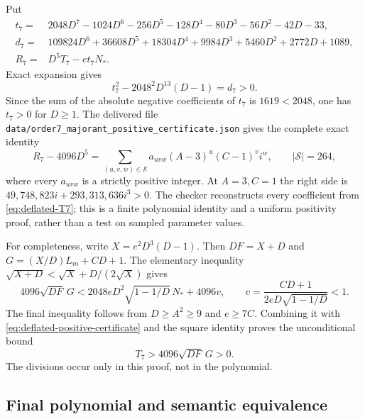 Put
\begin{align*}
 t_7={}&2048D^7-1024D^6-256D^5-128D^4
           -80D^3-56D^2-42D-33,\\
 d_7={}&109824D^6+36608D^5+18304D^4+9984D^3
           +5460D^2+2772D+1089,\\
 R_7={}&D^5T_7-et_7N_*.
\end{align*}
Exact expansion gives
\[
 t_7^2-2048^2D^{13}(D-1)=d_7>0.
\]
Since the sum of the absolute negative coefficients of \(t_7\) is
\(1619<2048\), one has \(t_7>0\) for \(D\geq1\).  The delivered
file \texttt{data/order7\_majorant\_positive\_certificate.json} gives
the complete exact identity
\begin{equation}
 R_7-4096D^5
   =\sum_{(u,v,w)\in\mathcal S} a_{uvw}(A-3)^u(C-1)^v i^w,
 \qquad |\mathcal S|=264,
 \label{eq:deflated-positive-certificate}
\end{equation}
where every \(a_{uvw}\) is a strictly positive integer.  At \(A=3,C=1\)
the right side is
\(49{,}748{,}823i+293{,}313{,}636i^3>0\).
The checker reconstructs every coefficient from
\eqref{eq:deflated-T7}; this is a finite polynomial identity and a uniform
positivity proof, rather than a test on sampled parameter values.

For completeness, write \(X=e^2D^3(D-1)\).  Then
\(DF=X+D\) and \(G=(X/D)L_m+CD+1\).  The elementary inequality
\(\sqrt{X+D}<\sqrt X+D/(2\sqrt X)\) gives
\[
 4096\sqrt{DF}\,G
 <2048eD^2\sqrt{1-1/D}\,N_*+4096v,
 \qquad
 v=\frac{CD+1}{2eD\sqrt{1-1/D}}<1.
\]
The final inequality follows from \(D\geq A^2\geq9\) and \(e\geq7C\).
Combining it with \eqref{eq:deflated-positive-certificate} and the square
identity proves the unconditional bound
\begin{equation}
             T_7>4096\sqrt{DF}\,G>0.
             \label{eq:deflated-majorant}
\end{equation}
The divisions occur only in this proof, not in the polynomial.

\subsection{Final polynomial and semantic equivalence}


